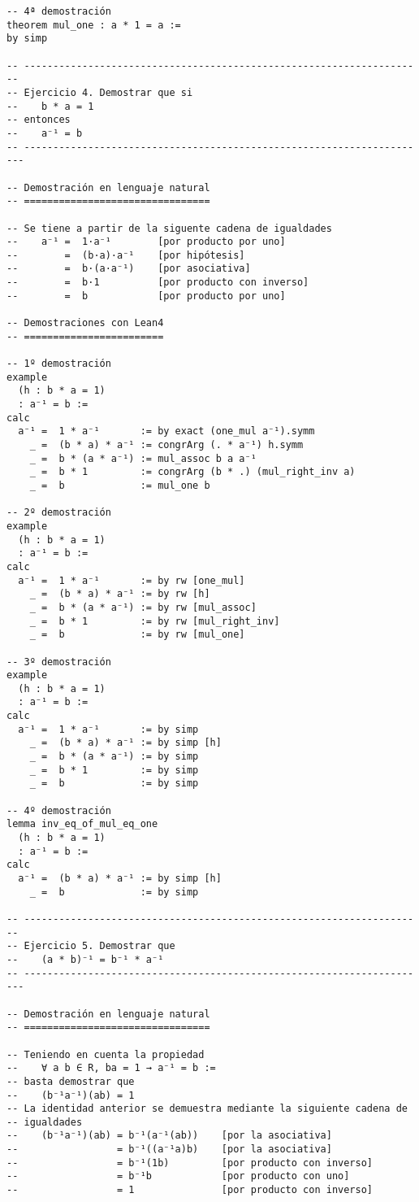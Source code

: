 \begin{verbatim}
-- 4ª demostración
theorem mul_one : a * 1 = a :=
by simp

-- ---------------------------------------------------------------------
-- Ejercicio 4. Demostrar que si
--    b * a = 1
-- entonces
--    a⁻¹ = b
-- ----------------------------------------------------------------------

-- Demostración en lenguaje natural
-- ================================

-- Se tiene a partir de la siguente cadena de igualdades
--    a⁻¹ =  1·a⁻¹        [por producto por uno]
--        =  (b·a)·a⁻¹    [por hipótesis]
--        =  b·(a·a⁻¹)    [por asociativa]
--        =  b·1          [por producto con inverso]
--        =  b            [por producto por uno]

-- Demostraciones con Lean4
-- ========================

-- 1º demostración
example
  (h : b * a = 1)
  : a⁻¹ = b :=
calc
  a⁻¹ =  1 * a⁻¹       := by exact (one_mul a⁻¹).symm
    _ =  (b * a) * a⁻¹ := congrArg (. * a⁻¹) h.symm
    _ =  b * (a * a⁻¹) := mul_assoc b a a⁻¹
    _ =  b * 1         := congrArg (b * .) (mul_right_inv a)
    _ =  b             := mul_one b

-- 2º demostración
example
  (h : b * a = 1)
  : a⁻¹ = b :=
calc
  a⁻¹ =  1 * a⁻¹       := by rw [one_mul]
    _ =  (b * a) * a⁻¹ := by rw [h]
    _ =  b * (a * a⁻¹) := by rw [mul_assoc]
    _ =  b * 1         := by rw [mul_right_inv]
    _ =  b             := by rw [mul_one]

-- 3º demostración
example
  (h : b * a = 1)
  : a⁻¹ = b :=
calc
  a⁻¹ =  1 * a⁻¹       := by simp
    _ =  (b * a) * a⁻¹ := by simp [h]
    _ =  b * (a * a⁻¹) := by simp
    _ =  b * 1         := by simp
    _ =  b             := by simp

-- 4º demostración
lemma inv_eq_of_mul_eq_one
  (h : b * a = 1)
  : a⁻¹ = b :=
calc
  a⁻¹ =  (b * a) * a⁻¹ := by simp [h]
    _ =  b             := by simp

-- ---------------------------------------------------------------------
-- Ejercicio 5. Demostrar que
--    (a * b)⁻¹ = b⁻¹ * a⁻¹
-- ----------------------------------------------------------------------

-- Demostración en lenguaje natural
-- ================================

-- Teniendo en cuenta la propiedad
--    ∀ a b ∈ R, ba = 1 → a⁻¹ = b :=
-- basta demostrar que
--    (b⁻¹a⁻¹)(ab) = 1
-- La identidad anterior se demuestra mediante la siguiente cadena de
-- igualdades
--    (b⁻¹a⁻¹)(ab) = b⁻¹(a⁻¹(ab))    [por la asociativa]
--                 = b⁻¹((a⁻¹a)b)    [por la asociativa]
--                 = b⁻¹(1b)         [por producto con inverso]
--                 = b⁻¹b            [por producto con uno]
--                 = 1               [por producto con inverso]


\end{verbatim}
